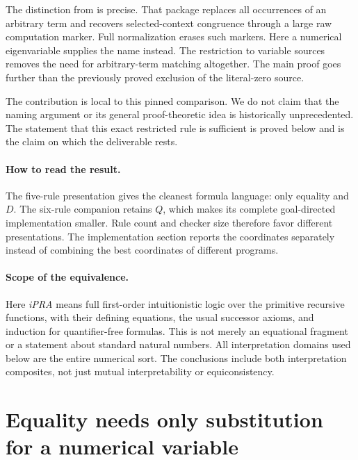 \documentclass[11pt]{article}
\theoremstyle{definition}
\theoremstyle{remark}
\newcommand{\code}[1]{\texttt{\detokenize{#1}}}
\begin{document}
The distinction from \code{template_free} is precise. That package replaces
all occurrences of an arbitrary term and recovers selected-context congruence
through a large raw computation marker. Full normalization erases such
markers. Here a numerical eigenvariable supplies the name instead.
The restriction to variable sources removes the need for arbitrary-term
matching altogether. The main proof goes further than the previously
proved exclusion of the literal-zero source.

The contribution is local to this pinned comparison. We do not claim
that the naming argument or its general proof-theoretic idea is historically
unprecedented. The statement that this exact restricted rule is sufficient
is proved below and is the claim on which the deliverable rests.

\paragraph{How to read the result.}
The five-rule presentation gives the cleanest formula language: only equality
and $D$. The six-rule companion retains $Q$, which makes its complete
goal-directed implementation smaller. Rule count and checker size therefore
favor different presentations. The implementation section reports the
coordinates separately instead of combining the best coordinates of
different programs.

\paragraph{Scope of the equivalence.}
Here \emph{iPRA} means full first-order intuitionistic logic over the primitive
recursive functions, with their defining equations, the usual successor
axioms, and induction for quantifier-free formulas. This is not merely
an equational fragment or a statement about standard natural numbers.
All interpretation domains used below are the entire numerical sort.
The conclusions include both interpretation composites, not just mutual
interpretability or equiconsistency.



\section{Equality needs only substitution for a numerical variable}
\label{sec:variable-equality}
\end{document}
